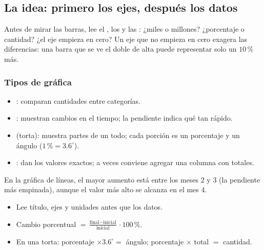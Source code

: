 

\subsection{La idea: primero los ejes, después los datos}
Antes de mirar las barras, lee el , los  y las : ¿miles o millones? ¿porcentaje
o cantidad? ¿el eje empieza en cero? Un eje que no empieza en cero exagera las diferencias: una barra que se ve el doble
de alta puede representar solo un $10\,\%$ más.

\subsubsection{Tipos de gráfica}
\begin{itemize}
  \item {}: comparan cantidades entre categorías.
  \item {}: muestran cambios en el tiempo; la pendiente indica qué tan rápido.
  \item {} (torta): muestra partes de un todo; cada porción es un porcentaje y un ángulo
  ($1\,\% = 3.6^\circ$).
  \item {}: dan los valores exactos; a veces conviene agregar una columna con totales.
\end{itemize}


En la gráfica de líneas, el mayor aumento está entre los meses 2 y 3 (la pendiente más empinada), aunque el valor más alto
se alcanza en el mes 4.

\begin{regla}
\begin{itemize}
  \item Lee título, ejes y unidades antes que los datos.
  \item Cambio porcentual $= \tfrac{\text{final} - \text{inicial}}{\text{inicial}} \cdot 100\,\%$.
  \item En una torta: porcentaje $\times 3.6^\circ =$ ángulo; porcentaje $\times$ total $=$ cantidad.
\end{itemize}
\end{regla}

